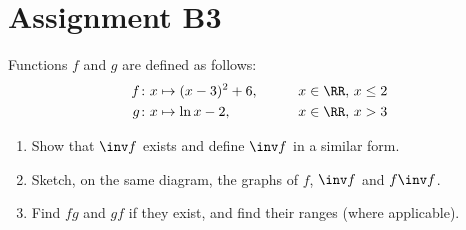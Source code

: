 \section{Assignment B3}

\begin{problem}
    Functions $f$ and $g$ are defined as follows:
    \begin{alignat*}{2}
        f & \colon x \mapsto (x-3)^2 + 6, &&\qquad x \in \RR, \, x \leq 2\\
        g & \colon x \mapsto \ln{x-2}, &&\qquad x \in \RR, \, x > 3
    \end{alignat*}

    \begin{enumerate}
        \item Show that $\inv f$ exists and define $\inv f$ in a similar form.
        \item Sketch, on the same diagram, the graphs of $f$, $\inv f$ and $f \inv f$.
        \item Find $fg$ and $gf$ if they exist, and find their ranges (where applicable).
    \end{enumerate}
\end{problem}
